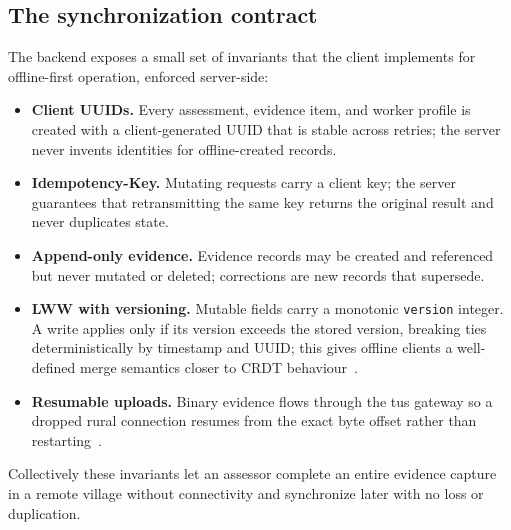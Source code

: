 \documentclass[conference]{IEEEtran}
\begin{document}
\subsection{The synchronization contract}
The backend exposes a small set of invariants that the client implements for offline-first
operation, enforced server-side:
\begin{itemize}
  \item \textbf{Client UUIDs.} Every assessment, evidence item, and worker profile is
        created with a client-generated UUID that is stable across retries; the server never
        invents identities for offline-created records.
  \item \textbf{Idempotency-Key.} Mutating requests carry a client key; the server
        guarantees that retransmitting the same key returns the original result and never
        duplicates state.
  \item \textbf{Append-only evidence.} Evidence records may be created and referenced but
        never mutated or deleted; corrections are new records that supersede.
  \item \textbf{LWW with versioning.} Mutable fields carry a monotonic \texttt{version}
        integer. A write applies only if its version exceeds the stored version, breaking
        ties deterministically by timestamp and UUID; this gives offline clients a
        well-defined merge semantics closer to CRDT behaviour~\cite{shapiro_crdt}.
  \item \textbf{Resumable uploads.} Binary evidence flows through the tus gateway so a
        dropped rural connection resumes from the exact byte offset
        rather than restarting~\cite{tus}.
\end{itemize}
Collectively these invariants let an assessor complete an entire evidence capture in a
remote village without connectivity and synchronize later with no loss or duplication.

\end{document}
